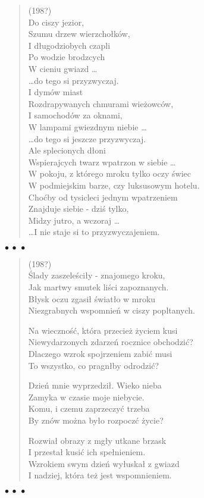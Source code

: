 \documentclass{article} %
\newenvironment{wierszd}[2]
	{\begin{verse} \hspace*{-1em}{\bf #1}\hfill{\small{(#2)}}\\[.5ex] }
	{\end{verse} \begin{center}$\bullet\ \bullet\ \bullet$\end{center}}
\newcommand{\e}{\eob}
\renewcommand{\a}{\aob}
\renewcommand{\o}{\'{o}}
\newcommand{\n}{\'{n}}
\newcommand{\s}{\'{s}}
\renewcommand{\S}{\'{S}}
\newcommand{\ci}{\'{c}}
\begin{document}
\begin{wierszd} {Przyzwyczajenie}{198?}
Do ciszy jezior, \\ 
Szumu drzew wierzcho{\l}k{\o}w, \\ 
I d{\l}ugodziobych czapli \\ 
Po wodzie brodz{\a}cych \\ 
W cieniu gwiazd \ldots \\ 
\ldots do tego si{\e} przyzwyczaj{\e}. \\ 
I dym{\o}w miast \\ 
Rozdrapywanych chmurami wie\.{z}owc{\o}w, \\ 
I samochod{\o}w za oknami, \\ 
W lampami gwiezdnym niebie \ldots \\ 
\ldots do tego si{\e} jeszcze przyzwyczaj{\e}. \\ 
Ale splecionych d{\l}oni \\ 
Wspieraj{\a}cych twarz wpatrzon{\a} w siebie \ldots \\ 
W pokoju, z kt{\o}rego mroku tylko oczy {\s}wiec{\a} \\ 
W podmiejskim barze, czy luksusowym hotelu. \\ 
Cho{\ci}by od tysi{\a}cleci jednym wpatrzeniem \\ 
Znajduje siebie - dzi{\s} tylko, \\ 
Mi{\e}dzy jutro, a wczoraj \ldots \\ 
\ldots I nie staje si{\e} to przyzwyczajeniem. 

\end{wierszd}
%
\begin{wierszd} {Wspomnienia}{198?}
{\S}lady zaszele{\s}ci{\l}y - znajomego kroku, \\ 
Jak martwy smutek li{\s}ci zapoznanych. \\ 
B{\l}ysk oczu zgasi{\l} {\s}wiat{\l}o w mroku \\ 
Niezgrabnych wspomnie{\n} w ciszy popl{\a}tanych. 

	Na wieczno{\s}{\ci}, kt{\o}ra przecie\.{z} \.{z}yciem kusi \\ 
	Niewydarzonych zdarze{\n} rocznice obchodzi{\ci}? \\ 
	Dlaczego wzrok spojrzeniem zabi{\ci} musi \\ 
	To wszystko, co pragn{\a}{\l}by odrodzi{\ci}? 

Dzie{\n} mnie wyprzedzi{\l}. Wieko nieba \\ 
Zamyka w czasie moje niebycie. \\ 
Komu, i czemu zaprzeczy{\ci} trzeba \\ 
By zn{\o}w mo\.{z}na by{\l}o rozpocz{\a}{\ci} \.{z}ycie? 

	Rozwia{\l} obrazy z mg{\l}y utkane brzask \\ 
	I przesta{\l} kusi{\ci} ich spe{\l}nieniem. \\ 
	Wzrokiem swym dzie{\n} wy{\l}uska{\l} z gwiazd \\ 
	I nadziej{\e}, kt{\o}ra te\.{z} jest wspomnieniem.
\end{wierszd}
%
\end{document}
